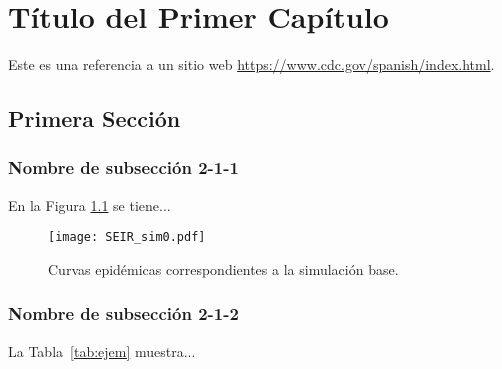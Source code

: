 \chapter{Título del Primer Capítulo}
\label{chap:Mod_Det}

\lipsum[10] Este es una referencia a un sitio web \url{https://www.cdc.gov/spanish/index.html}.

\section{Primera Sección}
\lipsum[100] 

\subsection{Nombre de subsección 2-1-1}
\lipsum[100] 

En la Figura \ref{fig:SEIR_sim0} se tiene...

\begin{figure}[h]
	\centering
	\texttt{[image: SEIR\_sim0.pdf]}
	\caption{Curvas epidémicas correspondientes a la simulación base.}
	\label{fig:SEIR_sim0}
\end{figure}

\lipsum[100]

\subsection{Nombre de subsección 2-1-2}
\lipsum[100]
 
 
La Tabla~\ref{tab:ejem} muestra...

\begin{table}[ht]
	\centering
	\caption{Estadísticas de la distribución}
	\label{tab:ejem}
\end{table}
\lipsum[100]

